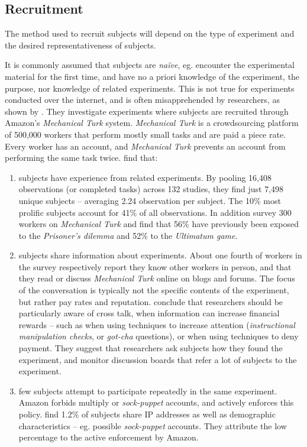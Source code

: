 \documentclass[preprint, 12pt]{elsarticle}
\begin{document}
\subsection{Recruitment}

The method used to recruit subjects will depend on the type of experiment and the desired representativeness of subjects. 

It is commonly assumed that subjects are \emph{naïve}, eg. encounter the experimental material for the first time, and have no a priori knowledge of the experiment, the purpose, nor knowledge of related experiments. This is not true for experiments conducted over the internet, and is often misapprehended by researchers, as shown by \citet*{Chandler_Mueller_Paolacci_2014}. They investigate experiments where subjects are recruited through Amazon's \emph{Mechanical Turk} system. \emph{Mechanical Turk} is a crowdsourcing platform of 500,000 workers that perform mostly small tasks and are paid a piece rate. Every worker has an account, and \emph{Mechanical Turk} prevents an account from performing the same task twice. \cite{Chandler_Mueller_Paolacci_2014} find that: 

\begin{enumerate}
\item subjects have experience from related experiments. By pooling 16,408 observations (or completed tasks) across 132 studies, they find just 7,498 unique subjects -- averaging 2.24 observation per subject. The 10\% most prolific subjects account for 41\% of all observations. In addition \cite{Chandler_Mueller_Paolacci_2014} survey 300 workers on \emph{Mechanical Turk} and find that 56\% have previously been exposed to the \emph{Prisoner's dilemma} and 52\% to the \emph{Ultimatum game}. 
\item subjects share information about experiments. About one fourth of workers in the \cite{Chandler_Mueller_Paolacci_2014} survey respectively report they know other workers in person, and that they read or discuss \emph{Mechanical Turk} online on blogs and forums. The focus of the conversation is typically not the specific contents of the experiment, but rather pay rates and reputation. \cite{Chandler_Mueller_Paolacci_2014} conclude that researchers should be particularly aware of cross talk, when information can increase financial rewards -- such as when using techniques to increase attention (\emph{instructional manipulation checks}, or \emph{got-cha} questions), or when using techniques to deny payment. They suggest that researchers ask subjects how they found the experiment, and monitor discussion boards that refer a lot of subjects to the experiment.
\item few subjects attempt to participate repeatedly in the same experiment. Amazon forbids multiply or \emph{sock-puppet} accounts, and actively enforces this policy. \cite{Chandler_Mueller_Paolacci_2014} find 1.2\% of subjects share IP addresses as well as demographic characteristics -- eg. possible \emph{sock-puppet} accounts. They attribute the low percentage to the active enforcement by Amazon.
\end{enumerate}
\end{document}
